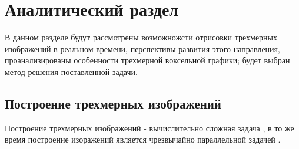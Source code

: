 \section*{Аналитический раздел}

В данном разделе будут рассмотрены возможножсти отрисовки 
трехмерных изображений в реальном времени, перспективы развития 
этого направления, проанализированы особенности трехмерной 
воксельной графики; будет выбран метод решения поставленной задачи.

\subsection*{Построение трехмерных изображений}

Построение трехмерных изображений - вычислительно сложная задача \cite{PBRT3e}, 
в то же время 
построение изоражений является чрезвычайно параллельной задачей \cite{DaBPP}.


